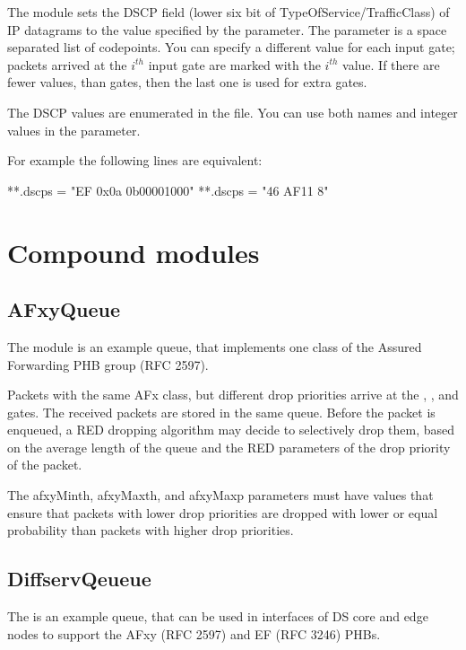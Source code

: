 The  module sets the DSCP field
(lower six bit of TypeOfService/TrafficClass) of IP datagrams
to the value specified by the  parameter.
The  parameter is a space separated list
of codepoints. You can specify a different value
for each input gate; packets arrived at the $i^{th}$
input gate are marked with the $i^{th}$ value.
If there are fewer values, than gates, then the last
one is used for extra gates.

The DSCP values are enumerated in the  file.
You can use both names and integer values in the 
parameter.

For example the following lines are equivalent:
\begin{inifile}
**.dscps = "EF 0x0a 0b00001000"
**.dscps = "46 AF11 8"
\end{inifile}

\section{Compound modules}

\subsection{AFxyQueue}

The  module is an example queue, that implements
one class of the Assured Forwarding PHB group (RFC 2597).

Packets with the same AFx class, but different drop priorities
arrive at the , , and  gates.
The received packets are stored in the same queue. Before the packet
is enqueued, a RED dropping algorithm may decide to selectively
drop them, based on the average length of the queue and the RED parameters
of the drop priority of the packet.

The afxyMinth, afxyMaxth, and afxyMaxp parameters must have values that
ensure that packets with lower drop priorities are dropped with lower
or equal probability than packets with higher drop priorities.

\subsection{DiffservQeueue}

The  is an example queue, that can be used in
interfaces of DS core and edge nodes to support
the AFxy (RFC 2597) and EF (RFC 3246) PHBs.


